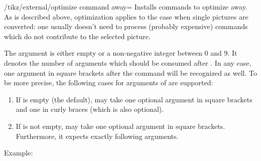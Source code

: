 {

\begin{key}{/tikz/external/optimize command away=}
	Installs commands to optimize  away. As is described above, optimization applies to the case when single pictures are converted: one usually doesn't need to process (probably expensive) commands which do not contribute to the selected picture.

	The argument  is either empty or a non-negative integer between $0$ and $9$. It denotes the number of arguments which should be consumed after . In any case, one argument in square brackets after the command will be recognized as well. To be more precise, the following cases for arguments of  are supported:
	\begin{enumerate}
		\item If  is empty (the default),  may take one optional argument in square brackets and one in curly braces (which is also optional).
		\item If  is not empty,  may take one optional argument in square brackets. Furthermore, it expects exactly  following arguments.
	\end{enumerate}

	Example:
\begin{codeexample}
\tikzset{external/optimize command away=\includegraphics}
\end{codeexample}

\begin{codeexample}
\newcommand{\myExpensiveMacro}[1]{Very expensive!}

\tikzset{external/optimize command away=\myExpensiveMacro}
\end{codeexample}

\begin{codeexample}
\newcommand{\myExpensiveMacroWithThreeArgs}[3]{Very expensive!}


\end{codeexample}
\end{key}}
